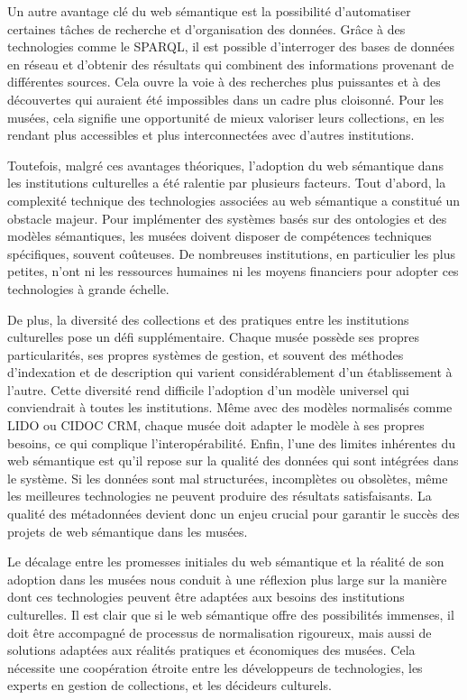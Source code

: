 Un autre avantage clé du web sémantique est la possibilité d'automatiser certaines tâches de recherche et d'organisation des données. Grâce à des technologies comme le SPARQL, il est possible d'interroger des bases de données en réseau et d’obtenir des résultats qui combinent des informations provenant de différentes sources. Cela ouvre la voie à des recherches plus puissantes et à des découvertes qui auraient été impossibles dans un cadre plus cloisonné. Pour les musées, cela signifie une opportunité de mieux valoriser leurs collections, en les rendant plus accessibles et plus interconnectées avec d'autres institutions. \newline

Toutefois, malgré ces avantages théoriques, l’adoption du web sémantique dans les institutions culturelles a été ralentie par plusieurs facteurs. Tout d’abord, la complexité technique des technologies associées au web sémantique a constitué un obstacle majeur. Pour implémenter des systèmes basés sur des ontologies et des modèles sémantiques, les musées doivent disposer de compétences techniques spécifiques, souvent coûteuses. De nombreuses institutions, en particulier les plus petites, n’ont ni les ressources humaines ni les moyens financiers pour adopter ces technologies à grande échelle.\newline

De plus, la diversité des collections et des pratiques entre les institutions culturelles pose un défi supplémentaire. Chaque musée possède ses propres particularités, ses propres systèmes de gestion, et souvent des méthodes d’indexation et de description qui varient considérablement d’un établissement à l’autre. Cette diversité rend difficile l’adoption d’un modèle universel qui conviendrait à toutes les institutions. Même avec des modèles normalisés comme LIDO ou CIDOC CRM, chaque musée doit adapter le modèle à ses propres besoins, ce qui complique l’interopérabilité.
Enfin, l'une des limites inhérentes du web sémantique est qu'il repose sur la qualité des données qui sont intégrées dans le système. Si les données sont mal structurées, incomplètes ou obsolètes, même les meilleures technologies ne peuvent produire des résultats satisfaisants. La qualité des métadonnées devient donc un enjeu crucial pour garantir le succès des projets de web sémantique dans les musées.\newline

Le décalage entre les promesses initiales du web sémantique et la réalité de son adoption dans les musées nous conduit à une réflexion plus large sur la manière dont ces technologies peuvent être adaptées aux besoins des institutions culturelles. Il est clair que si le web sémantique offre des possibilités immenses, il doit être accompagné de processus de normalisation rigoureux, mais aussi de solutions adaptées aux réalités pratiques et économiques des musées. Cela nécessite une coopération étroite entre les développeurs de technologies, les experts en gestion de collections, et les décideurs culturels.

